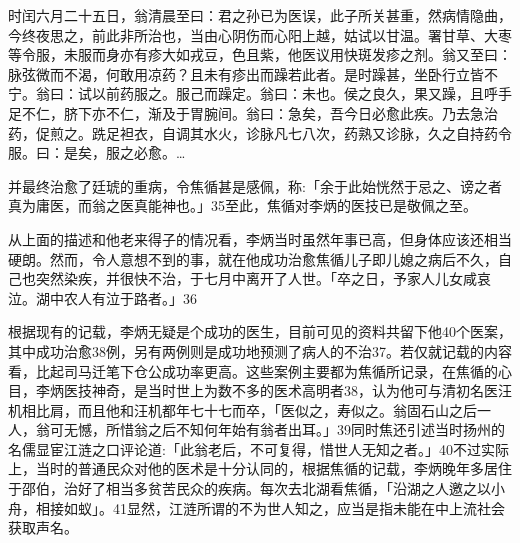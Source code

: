 \begin{BookQuote}
时闰六月二十五日，翁清晨至曰：君之孙已为医误，此子所关甚重，然病情隐曲，今终夜思之，前此非所治也，当由心阴伤而心阳上越，姑试以甘温。署甘草、大枣等令服，未服而身亦有疹大如戎豆，色且紫，他医议用快斑发疹之剂。翁又至曰：脉弦微而不渴，何敢用凉药？且未有疹出而躁若此者。是时躁甚，坐卧行立皆不宁。翁曰：试以前药服之。服己而躁定。翁曰：未也。侯之良久，果又躁，且呼手足不仁，脐下亦不仁，渐及于胃腕间。翁曰：急矣，吾今日必愈此疾。乃去急治药，促煎之。跣足袒衣，自调其水火，诊脉凡七八次，药熟又诊脉，久之自持药令服。曰：是矣，服之必愈。…
\end{BookQuote}

并最终治愈了廷琥的重病，令焦循甚是感佩，称:「余于此始恍然于忌之、谤之者真为庸医，而翁之医真能神也。」35至此，焦循对李炳的医技已是敬佩之至。

从上面的描述和他老来得子的情况看，李炳当时虽然年事已高，但身体应该还相当硬朗。然而，令人意想不到的事，就在他成功治愈焦循儿子即儿媳之病后不久，自己也突然染疾，并很快不治，于七月中离开了人世。「卒之日，予家人儿女咸哀泣。湖中农人有泣于路者。」36

\vfill
\begin{BookNotes}
\end{BookNotes}


根据现有的记载，李炳无疑是个成功的医生，目前可见的资料共留下他40个医案，其中成功治愈38例，另有两例则是成功地预测了病人的不治37。若仅就记载的内容看，比起司马迁笔下仓公成功率更高。这些案例主要都为焦循所记录，在焦循的心目，李炳医技神奇，是当时世上为数不多的医术高明者38，认为他可与清初名医汪机相比肩，而且他和汪机都年七十七而卒，「医似之，寿似之。翁固石山之后一人，翁可无憾，所惜翁之后不知何年始有翁者出耳。」39同时焦还引述当时扬州的名儒显宦江涟之口评论道:「此翁老后，不可复得，惜世人无知之者。」40不过实际上，当时的普通民众对他的医术是十分认同的，根据焦循的记载，李炳晚年多居住于邵伯，治好了相当多贫苦民众的疾病。每次去北湖看焦循，「沿湖之人邀之以小舟，相接如蚁」。41显然，江涟所谓的不为世人知之，应当是指未能在中上流社会获取声名。

